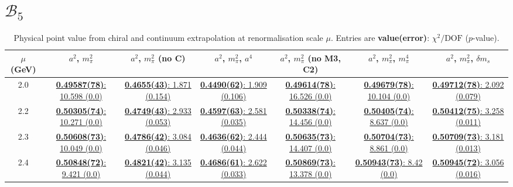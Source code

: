 \documentclass[12pt]{extarticle}
\begin{document}
\section{$\mathcal{B}_5$}
\begin{table}[h!]
\begin{center}
\begin{tabular}{|c|c|c|c|c|c|c|}
\hline
$\mu$ (GeV) & $a^2$, $m_\pi^2$& $a^2$, $m_\pi^2$ (no C)& $a^2$, $m_\pi^2$, $a^4$& $a^2$, $m_\pi^2$ (no M3, C2)& $a^2$, $m_\pi^2$, $m_\pi^4$& $a^2$, $m_\pi^2$, $\delta m_s$\\
\hline
2.0& \hyperlink{TT/SUSY/bag_a2m2_20.pdf.1}{\textbf{0.49587(78)}: 10.598 (0.0)} & \hyperlink{TT/SUSY/bag_a2m2noC_20.pdf.1}{\textbf{0.4655(43)}: 1.871 (0.154)} & \hyperlink{TT/SUSY/bag_a2a4m2_20.pdf.1}{\textbf{0.4490(62)}: 1.909 (0.106)} & \hyperlink{TT/SUSY/bag_a2m2mcut_20.pdf.1}{\textbf{0.49614(78)}: 16.526 (0.0)} & \hyperlink{TT/SUSY/bag_a2m2m4_20.pdf.1}{\textbf{0.49679(78)}: 10.104 (0.0)} & \hyperlink{TT/SUSY/bag_a2m2delm_20.pdf.1}{\textbf{0.49712(78)}: 2.092 (0.079)}\\
2.2& \hyperlink{TT/SUSY/bag_a2m2_22.pdf.1}{\textbf{0.50305(74)}: 10.271 (0.0)} & \hyperlink{TT/SUSY/bag_a2m2noC_22.pdf.1}{\textbf{0.4749(43)}: 2.933 (0.053)} & \hyperlink{TT/SUSY/bag_a2a4m2_22.pdf.1}{\textbf{0.4597(63)}: 2.581 (0.035)} & \hyperlink{TT/SUSY/bag_a2m2mcut_22.pdf.1}{\textbf{0.50338(74)}: 14.456 (0.0)} & \hyperlink{TT/SUSY/bag_a2m2m4_22.pdf.1}{\textbf{0.50405(74)}: 8.637 (0.0)} & \hyperlink{TT/SUSY/bag_a2m2delm_22.pdf.1}{\textbf{0.50412(75)}: 3.258 (0.011)}\\
2.3& \hyperlink{TT/SUSY/bag_a2m2_23.pdf.1}{\textbf{0.50608(73)}: 10.049 (0.0)} & \hyperlink{TT/SUSY/bag_a2m2noC_23.pdf.1}{\textbf{0.4786(42)}: 3.084 (0.046)} & \hyperlink{TT/SUSY/bag_a2a4m2_23.pdf.1}{\textbf{0.4636(62)}: 2.444 (0.044)} & \hyperlink{TT/SUSY/bag_a2m2mcut_23.pdf.1}{\textbf{0.50635(73)}: 14.407 (0.0)} & \hyperlink{TT/SUSY/bag_a2m2m4_23.pdf.1}{\textbf{0.50704(73)}: 8.861 (0.0)} & \hyperlink{TT/SUSY/bag_a2m2delm_23.pdf.1}{\textbf{0.50709(73)}: 3.181 (0.013)}\\
2.4& \hyperlink{TT/SUSY/bag_a2m2_24.pdf.1}{\textbf{0.50848(72)}: 9.421 (0.0)} & \hyperlink{TT/SUSY/bag_a2m2noC_24.pdf.1}{\textbf{0.4821(42)}: 3.135 (0.044)} & \hyperlink{TT/SUSY/bag_a2a4m2_24.pdf.1}{\textbf{0.4686(61)}: 2.622 (0.033)} & \hyperlink{TT/SUSY/bag_a2m2mcut_24.pdf.1}{\textbf{0.50869(73)}: 13.378 (0.0)} & \hyperlink{TT/SUSY/bag_a2m2m4_24.pdf.1}{\textbf{0.50943(73)}: 8.42 (0.0)} & \hyperlink{TT/SUSY/bag_a2m2delm_24.pdf.1}{\textbf{0.50945(72)}: 3.056 (0.016)}\\
\hline
\end{tabular}
\caption{Physical point value from chiral and continuum extrapolation at renormalisation scale $\mu$. Entries are \textbf{value(error)}: $\chi^2/\text{DOF}$ ($p$-value).}
\end{center}
\end{table}
\end{document}
